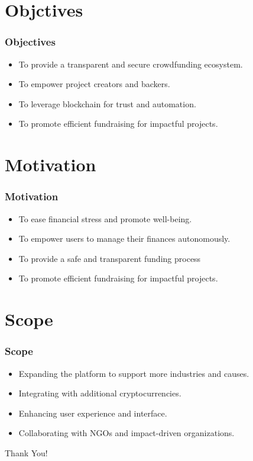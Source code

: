 \documentclass{beamer}
\begin{document}
\section{Objctives}
\begin{frame}
\frametitle{Objectives}
  \begin{itemize}
    \item To provide a transparent and secure crowdfunding ecosystem.
    \vspace{10pt}
    \item To empower project creators and backers.
    \vspace{10pt}
    \item To leverage blockchain for trust and automation.
    \vspace{10pt}
    \item To promote efficient fundraising for impactful projects.
  \end{itemize}
\end{frame}


\section{Motivation}
\begin{frame}
\frametitle{Motivation}
  \begin{itemize}
    \item To ease financial stress and promote well-being.
    \vspace{10pt}
    \item To empower users to manage their finances autonomously.
    \vspace{10pt}
    \item To provide a safe and transparent funding process
    \vspace{10pt}
    \item To promote efficient fundraising for impactful projects.
  \end{itemize}
\end{frame}


\section{Scope}
\begin{frame}
\frametitle{Scope}
  \begin{itemize} 
    \item Expanding the platform to support more industries and causes.
    \vspace{10pt}
    \item Integrating with additional cryptocurrencies.
    \vspace{10pt}
    \item Enhancing user experience and interface.
    \vspace{10pt}
    \item Collaborating with NGOs and impact-driven organizations.
  \end{itemize}
\end{frame}


{
\begin{frame}[plain]
  \centering
  \Huge{Thank You!}
\end{frame}
}
\end{document}
